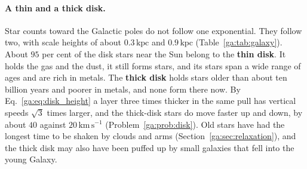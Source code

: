 \paragraph{A thin and a thick disk.} Star counts toward the Galactic poles do not follow one exponential. They follow two, with scale heights of about $0.3\,\mathrm{kpc}$ and $0.9\,\mathrm{kpc}$ (Table~\ref{ga:tab:galaxy}). About $95$ per cent of the disk stars near the Sun belong to the \textbf{thin disk}. It holds the gas and the dust, it still forms stars, and its stars span a wide range of ages and are rich in metals. The \textbf{thick disk} holds stars older than about ten billion years and poorer in metals, and none form there now. By Eq.~\eqref{ga:eq:disk_height} a layer three times thicker in the same pull has vertical speeds $\sqrt3$ times larger, and the thick-disk stars do move faster up and down, by about $40$ against $20\,\mathrm{km\,s^{-1}}$ (Problem~\ref{ga:prob:disk}). Old stars have had the longest time to be shaken by clouds and arms (Section~\ref{ga:sec:relaxation}), and the thick disk may also have been puffed up by small galaxies that fell into the young Galaxy.

